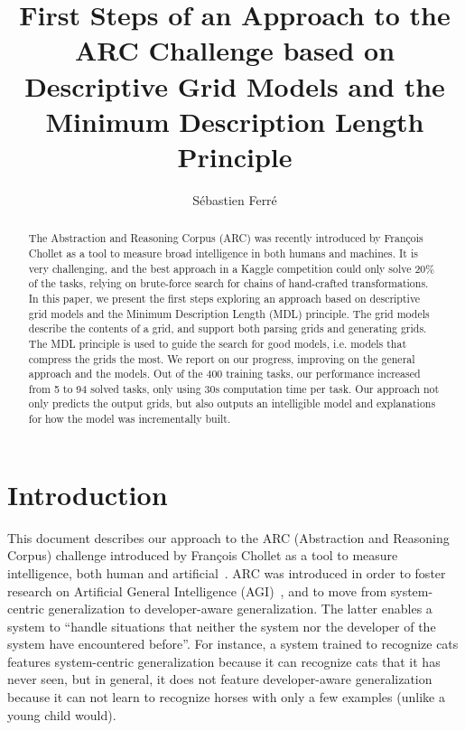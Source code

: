 \documentclass[a4paper]{llncs}
\newcommand{\HIDE}[1]{}
\begin{document}
\title{First Steps of an Approach to the ARC Challenge based on Descriptive Grid Models and the Minimum Description Length Principle}

\author{Sébastien Ferré}


\maketitle

\begin{abstract}
  The Abstraction and Reasoning Corpus (ARC) was recently introduced
  by François Chollet as a tool to measure broad intelligence in both
  humans and machines. It is very challenging, and the best approach
  in a Kaggle competition could only solve 20\% of the tasks, relying
  on brute-force search for chains of hand-crafted transformations.
  In this paper, we present the first steps exploring an approach
  based on descriptive grid models and the Minimum Description Length
  (MDL) principle. The grid models describe the contents of a grid,
  and support both parsing grids and generating grids. The MDL
  principle is used to guide the search for good models, i.e. models
  that compress the grids the most.
  We report on our progress, improving on the general approach and the
  models. Out of the 400 training tasks, our performance increased
  from 5 to 94 solved tasks, only using 30s computation time per
  task. Our approach not only predicts the output grids, but also
  outputs an intelligible model and explanations for how the model was
  incrementally built.
\end{abstract}

\HIDE{
Measure of Intelligence
Artificial Intelligence
Explainable AI
Program Synthesis
Structured Prediction
Minimum Description Length
2D Parsing
}

\sloppy

\section{Introduction}
\label{intro}

This document describes our approach to the ARC (Abstraction and
Reasoning Corpus) challenge introduced by François Chollet as a tool
to measure intelligence, both human and artificial~\cite{Chollet2019}.
ARC was introduced in order to foster research on Artificial General
Intelligence (AGI)~\cite{Goertzel2014agi}, and to move from
system-centric generalization to developer-aware
generalization. The latter enables a system to ``handle situations
that neither the system nor the developer of the system have
encountered before''. For instance, a system trained to recognize cats
features system-centric generalization because it can recognize cats
that it has never seen, but in general, it does not feature
developer-aware generalization because it can not learn to recognize
horses with only a few examples (unlike a young child would).
\end{document}
